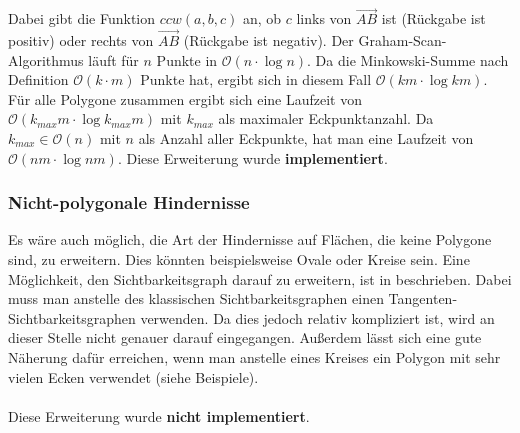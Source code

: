 \documentclass[a4paper, notitlepage, 12pt]{scrartcl}
\begin{document}
\hspace*{-1em}Dabei gibt die Funktion $ccw(a,b,c)$ an, ob $c$ links von $\overrightarrow{AB}$ ist (Rückgabe ist positiv) oder rechts von $\overrightarrow{AB}$ (Rückgabe ist negativ). Der Graham-Scan-Algorithmus läuft für $n$ Punkte in $\mathcal{O}(n \cdot \log n)$. Da die Minkowski-Summe nach Definition $\mathcal{O}(k \cdot m)$ Punkte hat, ergibt sich in diesem Fall $\mathcal{O}(km \cdot \log km)$. Für alle Polygone zusammen ergibt sich eine Laufzeit von $\mathcal{O}(k_{max}m \cdot \log k_{max}m)$ mit $k_{max}$ als maximaler Eckpunktanzahl. Da $k_{max} \in \mathcal{O}(n)$ mit $n$ als Anzahl aller Eckpunkte, hat man eine Laufzeit von $\mathcal{O}(nm \cdot \log nm)$. Diese Erweiterung wurde \textbf{implementiert}.
 \subsubsection{Nicht-polygonale Hindernisse}
 Es wäre auch möglich, die Art der Hindernisse auf Flächen, die keine Polygone sind, zu erweitern. Dies könnten beispielsweise Ovale oder Kreise sein. Eine Möglichkeit, den Sichtbarkeitsgraph darauf zu erweitern, ist in \cite{Src:arcvis} beschrieben. Dabei muss man anstelle des klassischen Sichtbarkeitsgraphen einen Tangenten-Sichtbarkeitsgraphen verwenden. Da dies jedoch relativ kompliziert ist, wird an dieser Stelle nicht genauer darauf eingegangen. Außerdem lässt sich eine gute Näherung dafür erreichen, wenn man anstelle eines Kreises ein Polygon mit sehr vielen Ecken verwendet (siehe Beispiele). \\ \\
 Diese Erweiterung wurde \textbf{nicht implementiert}.
\end{document}
